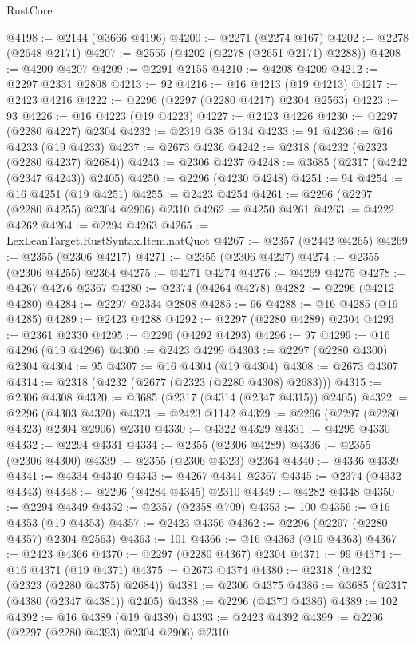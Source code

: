 \begin{lexlean}{RustCore}
\begin{coremodule}
@4198 := @2144 (@3666 @4196)
@4200 := @2271 (@2274 @167)
@4202 := @2278 (@2648 @2171)
@4207 := @2555 (@4202 (@2278 (@2651 @2171) @2288))
@4208 := @4200 @4207
@4209 := @2291 @2155
@4210 := @4208 @4209
@4212 := @2297 @2331 @2808
@4213 := 92
@4216 := @16 @4213 (@19 @4213)
@4217 := @2423 @4216
@4222 := @2296 (@2297 (@2280 @4217) @2304 @2563)
@4223 := 93
@4226 := @16 @4223 (@19 @4223)
@4227 := @2423 @4226
@4230 := @2297 (@2280 @4227) @2304
@4232 := @2319 @38 @134
@4233 := 91
@4236 := @16 @4233 (@19 @4233)
@4237 := @2673 @4236
@4242 := @2318 (@4232 (@2323 (@2280 @4237) @2684))
@4243 := @2306 @4237
@4248 := @3685 (@2317 (@4242 (@2347 @4243)) @2405)
@4250 := @2296 (@4230 @4248)
@4251 := 94
@4254 := @16 @4251 (@19 @4251)
@4255 := @2423 @4254
@4261 := @2296 (@2297 (@2280 @4255) @2304 @2906) @2310
@4262 := @4250 @4261
@4263 := @4222 @4262
@4264 := @2294 @4263
@4265 := LexLeanTarget.RustSyntax.Item.natQuot
@4267 := @2357 (@2442 @4265)
@4269 := @2355 (@2306 @4217)
@4271 := @2355 (@2306 @4227)
@4274 := @2355 (@2306 @4255) @2364
@4275 := @4271 @4274
@4276 := @4269 @4275
@4278 := @4267 @4276 @2367
@4280 := @2374 (@4264 @4278)
@4282 := @2296 (@4212 @4280)
@4284 := @2297 @2334 @2808
@4285 := 96
@4288 := @16 @4285 (@19 @4285)
@4289 := @2423 @4288
@4292 := @2297 (@2280 @4289) @2304
@4293 := @2361 @2330
@4295 := @2296 (@4292 @4293)
@4296 := 97
@4299 := @16 @4296 (@19 @4296)
@4300 := @2423 @4299
@4303 := @2297 (@2280 @4300) @2304
@4304 := 95
@4307 := @16 @4304 (@19 @4304)
@4308 := @2673 @4307
@4314 := @2318 (@4232 (@2677 (@2323 (@2280 @4308) @2683)))
@4315 := @2306 @4308
@4320 := @3685 (@2317 (@4314 (@2347 @4315)) @2405)
@4322 := @2296 (@4303 @4320)
@4323 := @2423 @1142
@4329 := @2296 (@2297 (@2280 @4323) @2304 @2906) @2310
@4330 := @4322 @4329
@4331 := @4295 @4330
@4332 := @2294 @4331
@4334 := @2355 (@2306 @4289)
@4336 := @2355 (@2306 @4300)
@4339 := @2355 (@2306 @4323) @2364
@4340 := @4336 @4339
@4341 := @4334 @4340
@4343 := @4267 @4341 @2367
@4345 := @2374 (@4332 @4343)
@4348 := @2296 (@4284 @4345) @2310
@4349 := @4282 @4348
@4350 := @2294 @4349
@4352 := @2357 (@2358 @709)
@4353 := 100
@4356 := @16 @4353 (@19 @4353)
@4357 := @2423 @4356
@4362 := @2296 (@2297 (@2280 @4357) @2304 @2563)
@4363 := 101
@4366 := @16 @4363 (@19 @4363)
@4367 := @2423 @4366
@4370 := @2297 (@2280 @4367) @2304
@4371 := 99
@4374 := @16 @4371 (@19 @4371)
@4375 := @2673 @4374
@4380 := @2318 (@4232 (@2323 (@2280 @4375) @2684))
@4381 := @2306 @4375
@4386 := @3685 (@2317 (@4380 (@2347 @4381)) @2405)
@4388 := @2296 (@4370 @4386)
@4389 := 102
@4392 := @16 @4389 (@19 @4389)
@4393 := @2423 @4392
@4399 := @2296 (@2297 (@2280 @4393) @2304 @2906) @2310

\end{coremodule}
\end{lexlean}
